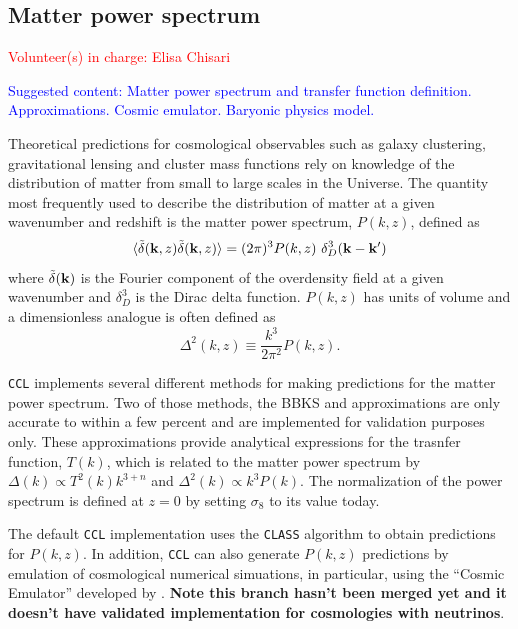 \documentclass[\docopts]{\docclass}
\newcommand{\vol}[1]{\textcolor{red}{Volunteer(s) in charge: #1}}
\newcommand{\cont}[1]{\textcolor{blue}{Suggested content: #1}}
\newcommand{\ccl}{{\tt CCL}\xspace}
\begin{document}
\subsection{Matter power spectrum}
\vol{Elisa Chisari}

\cont{Matter power spectrum and transfer function definition. Approximations. Cosmic emulator. Baryonic physics model.}

Theoretical predictions for cosmological observables such as galaxy clustering, gravitational lensing and cluster mass functions rely on knowledge of the distribution of matter from small to large scales in the Universe. The quantity most frequently used to describe the distribution of matter at a given wavenumber and redshift is the matter power spectrum, $P(k,z)$, defined as
\begin{equation}
  \langle \tilde\delta({\bf k},z)\tilde\delta({\bf k},z)\rangle = (2\pi)^3P(k,z)\
\delta_D^3({\bf k}-{\bf k}')
\end{equation}
where $\tilde\delta({\bf k})$ is the Fourier component of the overdensity field at a given wavenumber and $\delta_D^3$ is the Dirac delta function. $P(k,z)$ has units of volume and a dimensionless analogue is often defined as
\begin{equation}
  \Delta^2(k,z) \equiv \frac{k^3}{2\pi^2}P(k,z).
\end{equation}

\ccl implements several different methods for making predictions for the matter power spectrum. Two of those methods, the BBKS \citep{BBKS} and \citet{1998ApJ...496..605E} approximations are only accurate to within a few percent and are implemented for validation purposes only. These approximations provide analytical expressions for the trasnfer function, $T(k)$, which is related to the matter power spectrum by $\Delta(k)\propto T^2(k)k^{3+n}$ and $\Delta^2(k)\propto k^3P(k)$. The normalization of the power spectrum is defined at $z=0$ by setting $\sigma_8$ to its value today.

The default \ccl implementation uses the {\tt CLASS} algorithm \citet{class} to obtain predictions for $P(k,z)$. In addition, \ccl can also generate $P(k,z)$ predictions by emulation of cosmological numerical simuations, in particular, using the ``Cosmic Emulator'' developed by \citet{Lawrence17}. {\bf Note this branch hasn't been merged yet and it doesn't have validated implementation for cosmologies with neutrinos}. 
\end{document}
